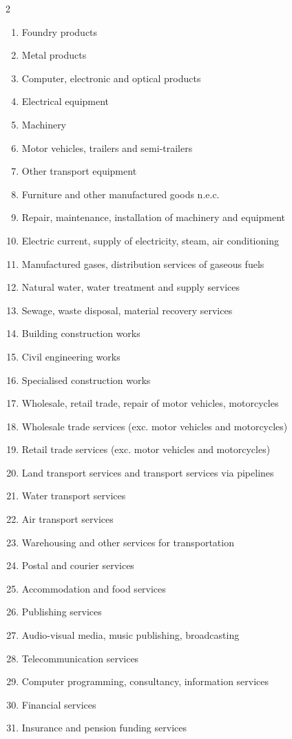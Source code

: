 \documentclass{article}
\begin{document}
\begin{multicols}{2}
\begin{enumerate}[leftmargin=*,itemsep=0pt,parsep=0pt]
\item Foundry products
\item Metal products
\item Computer, electronic and optical products
\item Electrical equipment
\item Machinery
\item Motor vehicles, trailers and semi-trailers
\item Other transport equipment
\item Furniture and other manufactured goods n.e.c.
\item Repair, maintenance, installation of machinery and equipment
\item Electric current, supply of electricity, steam, air conditioning
\item Manufactured gases, distribution services of gaseous fuels
\item Natural water, water treatment and supply services
\item Sewage, waste disposal, material recovery services
\item Building construction works
\item Civil engineering works
\item Specialised construction works
\item Wholesale, retail trade, repair of motor vehicles, motorcycles
\item Wholesale trade services (exc. motor vehicles and motorcycles)
\item Retail trade services (exc. motor vehicles and motorcycles)
\item Land transport services and transport services via pipelines
\item Water transport services
\item Air transport services
\item Warehousing and other services for transportation
\item Postal and courier services
\item Accommodation and food services
\item Publishing services
\item Audio-visual media, music publishing, broadcasting
\item Telecommunication services
\item Computer programming, consultancy, information services
\item Financial services
\item Insurance and pension funding services

\end{enumerate}
\end{multicols}
\end{document}
